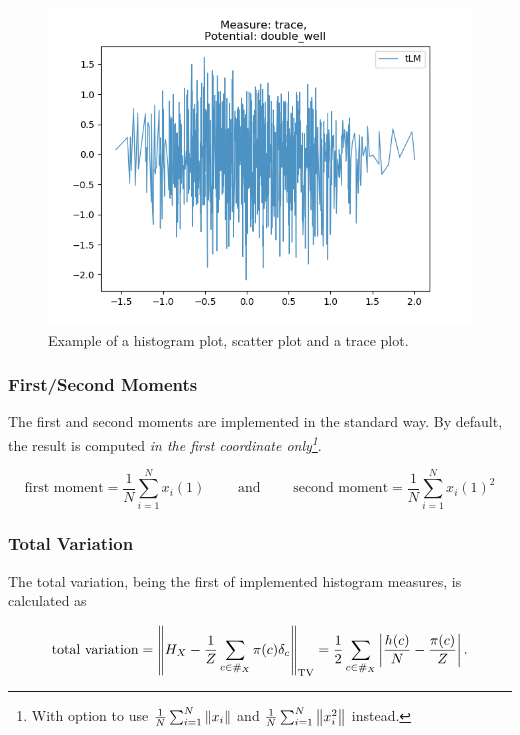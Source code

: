 \begin{figure}[H]
\begin{minipage}[b]{0.3\textwidth}
  \end{minipage} %
  \begin{minipage}[b]{0.3\textwidth}
  \centering
    \includegraphics[width=\textwidth]{Figures/trace_example.png}
  \end{minipage}
   \caption{Example of a histogram plot, scatter plot and a trace plot.}
\end{figure}



\subsubsection{First/Second Moments}
The first and second moments are implemented in the standard way. By default, the result is computed \textit{in the first coordinate only\footnote{With option to use $\frac 1 N\sum_{i=1}^N \norm{x_i}$ and $\frac 1 N\sum_{i=1}^N \norm{x_i^2}$ instead.}}.

$$ 
    \text{first moment} = \frac 1 N\sum_{i=1}^N x_i(1) \qquad \text{ and } \qquad \text{second moment} = \frac 1 N\sum_{i=1}^N x_i(1)^2
$$


\subsubsection{Total Variation}
The total variation, being the first of implemented histogram measures, is calculated as

\[\text{total variation} = \norm{H_X - \frac 1 Z \sum_{c \in \#_X} \pi(c) \delta_c}_{\text{TV}} = \frac 1 2\sum_{c \in \#_X} \left|\frac{h(c)}{N} - \frac{\pi(c)}{Z}\right| .\]

